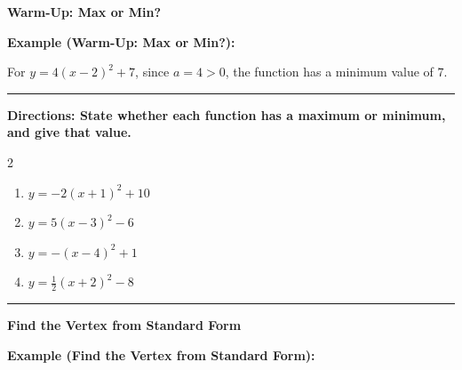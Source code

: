 \documentclass[12pt]{article}
\begin{document}
\vspace{0.35cm}

\begin{center}{\Large \textbf{Warm-Up: Max or Min?}}\end{center}\vspace{0.2cm}
\textbf{Example (Warm-Up: Max or Min?):}

For $y=4(x-2)^2+7$, since $a=4>0$, the function has a minimum value of $7$.

\vspace{0.2cm}\hrule\vspace{0.35cm}
\textbf{Directions: State whether each function has a maximum or minimum, and give that value.}

\begin{multicols}{2}
\begin{enumerate}[label=\textbf{\arabic*.}, start=1, itemsep=1.3cm]
  \item $\displaystyle y=-2(x+1)^2+10$
  \item $\displaystyle y=5(x-3)^2-6$
  \item $\displaystyle y=-(x-4)^2+1$
  \item $\displaystyle y=\frac{1}{2}(x+2)^2-8$
\end{enumerate}
\end{multicols}
\vspace{0.25cm}\hrule\vspace{0.35cm}

\begin{center}{\Large \textbf{Find the Vertex from Standard Form}}\end{center}\vspace{0.2cm}
\textbf{Example (Find the Vertex from Standard Form):}
\end{document}
